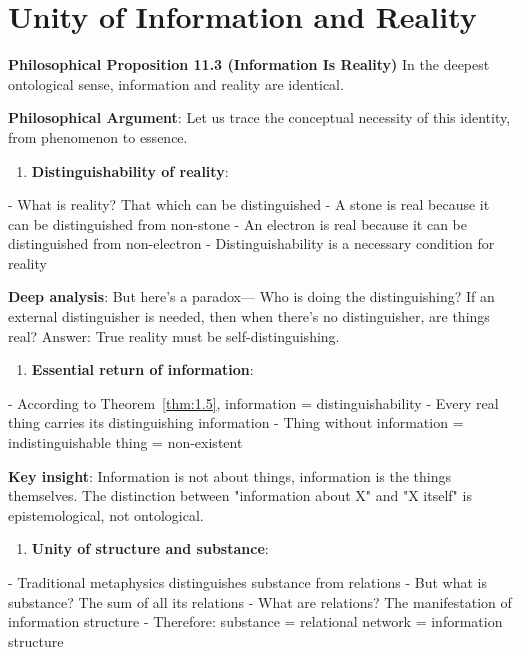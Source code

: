 \section{Unity of Information and Reality}
\label{sec:ch11_philosophy:unity-of-information-and-reality}

\textbf{Philosophical Proposition 11.3 (Information Is Reality)}
In the deepest ontological sense, information and reality are identical.

\textbf{Philosophical Argument}:
Let us trace the conceptual necessity of this identity, from phenomenon to essence.

\begin{enumerate}
\item \textbf{Distinguishability of reality}:
\end{enumerate}
   - What is reality? That which can be distinguished
   - A stone is real because it can be distinguished from non-stone
   - An electron is real because it can be distinguished from non-electron
   - Distinguishability is a necessary condition for reality
   
   \textbf{Deep analysis}: But here's a paradox---
   Who is doing the distinguishing? If an external distinguisher is needed,
   then when there's no distinguisher, are things real?
   Answer: True reality must be self-distinguishing.

\begin{enumerate}
\item \textbf{Essential return of information}:
\end{enumerate}
   - According to Theorem~\ref{thm:1.5}, information = distinguishability
   - Every real thing carries its distinguishing information
   - Thing without information = indistinguishable thing = non-existent
   
   \textbf{Key insight}: Information is not about things,
   information is the things themselves.
   The distinction between "information about X" and "X itself" is epistemological,
   not ontological.

\begin{enumerate}
\item \textbf{Unity of structure and substance}:
\end{enumerate}
   - Traditional metaphysics distinguishes substance from relations
   - But what is substance? The sum of all its relations
   - What are relations? The manifestation of information structure
   - Therefore: substance = relational network = information structure
   

